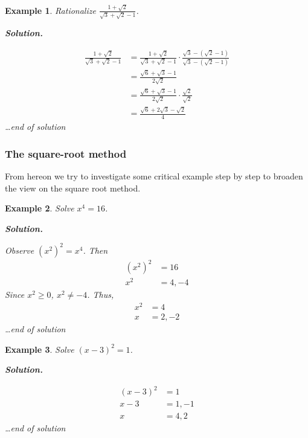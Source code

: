 \documentclass[12pt]{article}
\newtheorem*{example}{Example}
\newenvironment{solution}{\begin{snugshade*} \textbf{Solution.} \par}{\hfill \textit{\dots end of solution} \end{snugshade*}}
\begin{document}
    \begin{example}
        Rationalize $\frac{1+\sqrt{2}}{\sqrt{3}+\sqrt{2}-1}$.

        \begin{solution}
            \begin{align*}
                \frac{1+\sqrt{2}}{\sqrt{3}+\sqrt{2}-1}&=\frac{1+\sqrt{2}}{\sqrt{3}+\sqrt{2}-1}\cdot \frac{\sqrt{3}-(\sqrt{2}-1)}{\sqrt{3}-(\sqrt{2}-1)}\\
                &=\frac{\sqrt{6}+\sqrt{3}-1}{2\sqrt{2}}\\
                &=\frac{\sqrt{6}+\sqrt{3}-1}{2\sqrt{2}}\cdot \frac{\sqrt{2}}{\sqrt{2}}\\
                &=\frac{\sqrt{6}+2\sqrt{3}-\sqrt{2}}{4}
            \end{align*}
        \end{solution}
    \end{example}
    \subsubsection*{The square-root method}

    From hereon we try to investigate some critical example step by step to broaden the view on the square root method.

    \begin{example}
        Solve $x^4=16$.

        \begin{solution}
            Observe $(x^2)^2=x^4$. Then \begin{align*}
                (x^2)^2&=16\\
                x^2&=4,-4
            \end{align*}
            Since $x^2\geq 0$, $x^2\neq -4$. Thus,\begin{align*}
                x^2&=4\\
                x&=2,-2
            \end{align*}
        \end{solution}
    \end{example}

    \begin{example}
        Solve $(x-3)^2=1$.

        \begin{solution}
            \begin{align*}
                (x-3)^2&=1\\
                x-3&=1, -1\\
                x&=4, 2
            \end{align*}
        \end{solution}
    \end{example}
\end{document}
